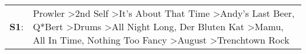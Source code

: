 \begin{supertabular}{p{0.03\textwidth}p{0.92\textwidth}}
 \textbf{S1}:  &  Prowler\textsuperscript{} \textgreater \enspace 2nd Self\textsuperscript{} \textgreater \enspace It's About That Time\textsuperscript{} \textgreater \enspace Andy's Last Beer\textsuperscript{}, \enspace Q*Bert\textsuperscript{} \textgreater \enspace Drums\textsuperscript{} \textgreater \enspace All Night Long\textsuperscript{}, \enspace Der Bluten Kat\textsuperscript{} \textgreater \enspace Mamu\textsuperscript{}, \enspace All In Time\textsuperscript{}, \enspace Nothing Too Fancy\textsuperscript{} \textgreater \enspace August\textsuperscript{} \textgreater \enspace Trenchtown Rock\textsuperscript{}  \enspace  \\
\end{supertabular}
